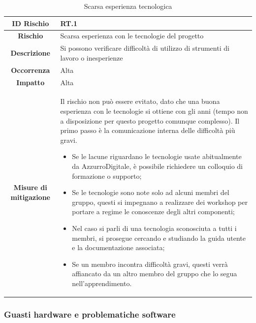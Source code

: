 \documentclass[10pt, a4paper]{article}
\begin{document}
{{{{\renewcommand{\arraystretch}{1.5}
\begin{table}[H]
\begin{tabularx}{\textwidth}{c|X}
\textbf{ID Rischio} & RT.1 \\
\hline
\textbf{Rischio} & Scarsa esperienza con le tecnologie del progetto \\
\hline
\textbf{Descrizione} & Si possono verificare difficoltà di utilizzo di strumenti di lavoro o inesperienze\\
\hline
\textbf{Occorrenza} & Alta\\
\hline
\textbf{Impatto} & Alta\\
\hline
\textbf{Misure di mitigazione} & Il rischio non può essere evitato, dato che una buona esperienza con le tecnologie si ottiene con gli anni (tempo non a disposizione per questo progetto comunque complesso). Il primo passo è la comunicazione interna delle difficoltà più gravi.
\begin{itemize}
    \item Se le lacune riguardano le tecnologie usate abitualmente da AzzurroDigitale, è possibile richiedere un colloquio di formazione o supporto;
    \item Se le tecnologie sono note solo ad alcuni membri del gruppo, questi si impegnano a realizzare dei workshop per portare a regime le conoscenze degli altri componenti;
    \item Nel caso si parli di una tecnologia sconosciuta a tutti i membri, si prosegue cercando e studiando la guida utente e la documentazione associata;
    \item Se un membro incontra difficoltà gravi, questi verrà affiancato da un altro membro del gruppo che lo segua nell'apprendimento.
\end{itemize}
\end{tabularx}
\caption{Scarsa esperienza tecnologica}
\end{table}


\subsubsection{Guasti hardware e problematiche software}

}}}}
\end{document}
